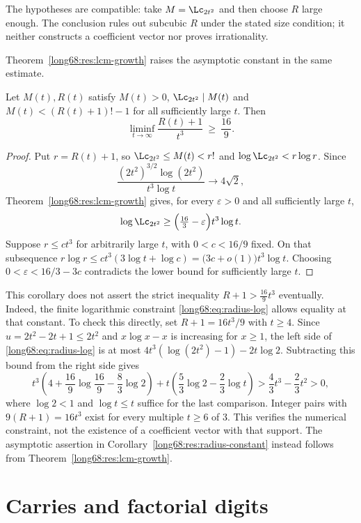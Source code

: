 The hypotheses are compatible: take $M=\Lc_{2t^2}$ and then choose
$R$ large enough. The conclusion rules out subcubic $R$ under the
stated size condition; it neither constructs a coefficient vector nor
proves irrationality.

Theorem~\ref{long68:res:lcm-growth} raises the asymptotic constant in the same
estimate.

\begin{corollary}\label{long68:res:radius-constant}
Let $M(t),R(t)$ satisfy $M(t)>0$, $\Lc_{2t^2}\mid M(t)$ and
$M(t)<(R(t)+1)!-1$ for all sufficiently large $t$.  Then
\[
 \liminf_{t\to\infty}\frac{R(t)+1}{t^3}\ \ge\ \frac{16}{9}.
\]
\end{corollary}

\begin{proof}
Put $r=R(t)+1$, so $\Lc_{2t^2}\le M(t)<r!$ and $\log \Lc_{2t^2}<r\log r$.
Since
\[
\frac{(2t^2)^{3/2}\log(2t^2)}{t^3\log t}\longrightarrow4\sqrt2,
\]
Theorem~\ref{long68:res:lcm-growth} gives, for every $\varepsilon>0$ and
all sufficiently large $t$,
\[
 \log \Lc_{2t^2}\ge
 \Bigl(\tfrac{16}{3}-\varepsilon\Bigr)t^3\log t.
\]
Suppose $r\le ct^3$ for arbitrarily large $t$, with $0<c<16/9$ fixed.  On that
subsequence $r\log r\le ct^3(3\log t+\log c)=\bigl(3c+o(1)\bigr)t^3\log t$.
Choosing $0<\varepsilon<16/3-3c$ contradicts the lower bound for
sufficiently large $t$.
\end{proof}

This corollary does not assert the strict inequality
$R+1>\tfrac{16}9t^3$ eventually. Indeed, the finite logarithmic constraint
\eqref{long68:eq:radius-log} allows equality at that constant. To check
this directly, set $R+1=16t^3/9$ with $t\ge4$. Since
$u=2t^2-2t+1\le2t^2$ and $x\log x-x$ is increasing for $x\ge1$, the
left side of \eqref{long68:eq:radius-log} is at most
$4t^3(\log(2t^2)-1)-2t\log2$. Subtracting this bound from the right side gives
\[
 t^3\left(4+\frac{16}{9}\log\frac{16}{9}-\frac83\log2\right)
 +t\left(\frac53\log2-\frac23\log t\right)
 >\frac43t^3-\frac23t^2>0,
\]
where $\log2<1$ and $\log t\le t$ suffice for the last comparison.
Integer pairs with $9(R+1)=16t^3$ exist for every multiple $t\ge6$ of $3$.
This verifies the numerical constraint, not the existence of a coefficient
vector with that support. The asymptotic assertion in
Corollary~\ref{long68:res:radius-constant} instead follows from
Theorem~\ref{long68:res:lcm-growth}.

\section{Carries and factorial digits}\label{long68:sec:carry}

